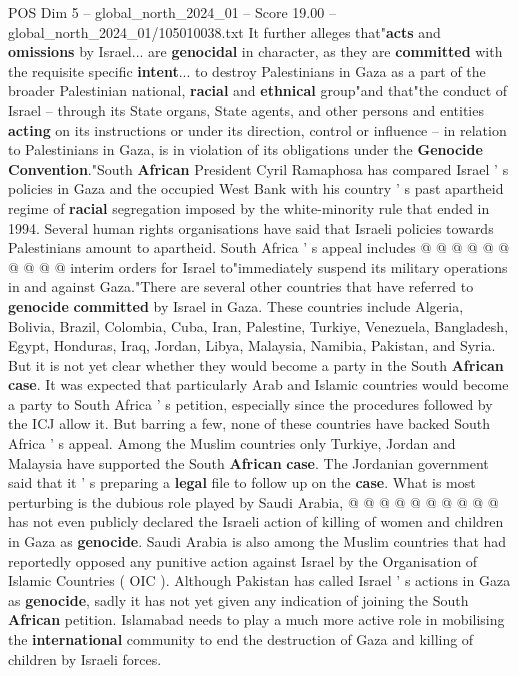 \begin{textsample}{POS Dim 5 – global\_north\_2024\_01 – Score 19.00 – global\_north\_2024\_01/105010038.txt}
It further alleges that"\textbf{acts} and \textbf{omissions} by Israel... are \textbf{genocidal} in character, as they are \textbf{committed} with the requisite specific \textbf{intent}... to destroy Palestinians in Gaza as a part of the broader Palestinian national, \textbf{racial} and \textbf{ethnical} group"and that"the conduct of Israel -- through its State organs, State agents, and other persons and entities \textbf{acting} on its instructions or under its direction, control or influence -- in relation to Palestinians in Gaza, is in violation of its obligations under the \textbf{Genocide} \textbf{Convention}."South \textbf{African} President Cyril Ramaphosa has compared Israel ' s policies in Gaza and the occupied West Bank with his country ' s past apartheid regime of \textbf{racial} segregation imposed by the white-minority rule that ended in 1994.
Several human rights organisations have said that Israeli policies towards Palestinians amount to apartheid.
South Africa ' s appeal includes @ @ @ @ @ @ @ @ @ @ interim orders for Israel to"immediately suspend its military operations in and against Gaza."There are several other countries that have referred to \textbf{genocide} \textbf{committed} by Israel in Gaza.
These countries include Algeria, Bolivia, Brazil, Colombia, Cuba, Iran, Palestine, Turkiye, Venezuela, Bangladesh, Egypt, Honduras, Iraq, Jordan, Libya, Malaysia, Namibia, Pakistan, and Syria.
But it is not yet clear whether they would become a party in the South \textbf{African} \textbf{case}.
It was expected that particularly Arab and Islamic countries would become a party to South Africa ' s petition, especially since the procedures followed by the ICJ allow it.
But barring a few, none of these countries have backed South Africa ' s appeal.
Among the Muslim countries only Turkiye, Jordan and Malaysia have supported the South \textbf{African} \textbf{case}.
The Jordanian government said that it ' s preparing a \textbf{legal} file to follow up on the \textbf{case}.
What is most perturbing is the dubious role played by Saudi Arabia, @ @ @ @ @ @ @ @ @ @ has not even publicly declared the Israeli action of killing of women and children in Gaza as \textbf{genocide}.
Saudi Arabia is also among the Muslim countries that had reportedly opposed any punitive action against Israel by the Organisation of Islamic Countries ( OIC ).
Although Pakistan has called Israel ' s actions in Gaza as \textbf{genocide}, sadly it has not yet given any indication of joining the South \textbf{African} petition.
Islamabad needs to play a much more active role in mobilising the \textbf{international} community to end the destruction of Gaza and killing of children by Israeli forces.

\end{textsample}
